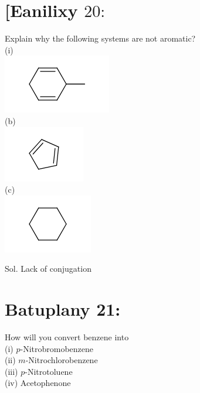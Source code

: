 \documentclass[10pt]{article}
\begin{document}
\section*{[Eanilixy $20:$}
Explain why the following systems are not aromatic?\\
(i)\\
\includegraphics{smile-2096e5dc26b2c346cec4a50bef5ee2def5ef11c0}\\
(b)\\
\includegraphics{smile-788ffcbc14cd3471ca59a1b9f3235fb840288c2d}\\
(c)\\
\includegraphics{smile-e0aade805fbdbe603f85bc4989d9c252080991be}

Sol. Lack of conjugation

\section*{Batuplany 21:}
How will you convert benzene into\\
(i) $p$-Nitrobromobenzene\\
(ii) $m$-Nitrochlorobenzene\\
(iii) $p$-Nitrotoluene\\
(iv) Acetophenone
\end{document}
